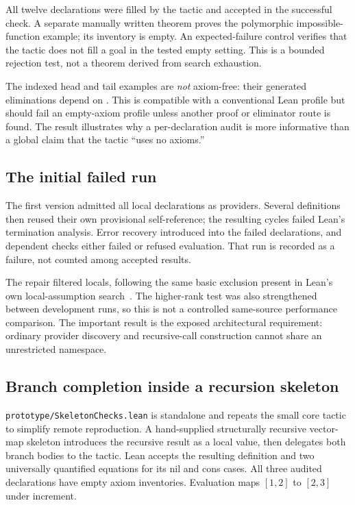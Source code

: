 \documentclass[11pt,letterpaper]{article}
\newcommand{\id}[1]{\texttt{\detokenize{#1}}}
\newcommand{\pathref}[1]{\nolinkurl{#1}}
\theoremstyle{definition}
\theoremstyle{remark}
\begin{document}
All twelve declarations were filled by the tactic and accepted in the successful check. A separate manually written theorem proves the polymorphic impossible-function example; its inventory is empty. An expected-failure control verifies that the tactic does not fill a \id{False} goal in the tested empty setting. This is a bounded rejection test, not a theorem derived from search exhaustion.

The indexed head and tail examples are \emph{not} axiom-free: their generated eliminations depend on \id{propext}. This is compatible with a conventional Lean profile but should fail an empty-axiom profile unless another proof or eliminator route is found. The result illustrates why a per-declaration audit is more informative than a global claim that the tactic ``uses no axioms.''

\subsection{The initial failed run}

The first version admitted all local declarations as providers. Several definitions then reused their own provisional self-reference; the resulting cycles failed Lean's termination analysis. Error recovery introduced \id{sorryAx} into the failed declarations, and dependent checks either failed or refused evaluation. That run is recorded as a failure, not counted among accepted results.

The repair filtered \id{isImplementationDetail} locals, following the same basic exclusion present in Lean's own local-assumption search~\cite{assumption}. The higher-rank test was also strengthened between development runs, so this is not a controlled same-source performance comparison. The important result is the exposed architectural requirement: ordinary provider discovery and recursive-call construction cannot share an unrestricted namespace.

\subsection{Branch completion inside a recursion skeleton}

\pathref{prototype/SkeletonChecks.lean} is standalone and repeats the small core tactic to simplify remote reproduction. A hand-supplied structurally recursive vector-map skeleton introduces the recursive result as a local value, then delegates both branch bodies to the tactic. Lean accepts the resulting definition and two universally quantified equations for its nil and cons cases. All three audited declarations have empty axiom inventories. Evaluation maps $[1,2]$ to $[2,3]$ under increment.
\end{document}
